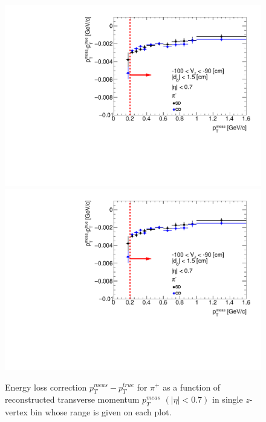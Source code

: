 \begin{figure}[H]
\caption[Energy loss correction for $\pi^+$ as a function of reconstructed transverse momentum $p_T^{meas}$.]{Energy loss correction $p_T^{meas}-p_T^{true}$ for $\pi^+$ as a function of reconstructed transverse momentum $p_T^{meas}$ $\left(|\eta|<0.7\right)$ in single $z$-vertex bin whose range is given on each plot.}\label{fig:energyLossPrimaryPi_plus}
\parbox{0.329\textwidth}{
  \includegraphics[width=\linewidth,page=63]{graphics/energyLoss/energyLoss3D_OnePrtAlso.pdf}\\
  \includegraphics[width=\linewidth,page=66]{graphics/energyLoss/energyLoss3D_OnePrtAlso.pdf}\\
}
\end{figure}
